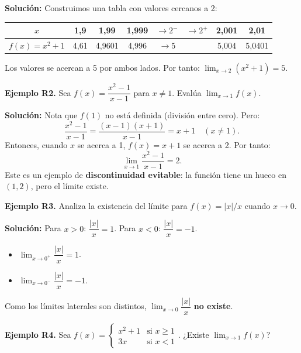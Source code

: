 \documentclass[12pt, a4paper]{article}
\begin{document}
\begin{cuadrosolucion}
  \textbf{Solución:} Construimos una tabla con valores cercanos a 2:
  \begin{center}
    \small
    \begin{tabular}{cccccccc}
      \toprule
      $x$            & 1{,}9  & 1{,}99   & 1{,}999 & $\to 2^-$ & $\to 2^+$ & 2{,}001 & 2{,}01   \\
      \midrule
      $f(x) = x^2+1$ & 4{,}61 & 4{,}9601 & 4{,}996 & $\to 5$   &           & 5{,}004 & 5{,}0401 \\
      \bottomrule
    \end{tabular}
  \end{center}
  Los valores se acercan a 5 por ambos lados. Por tanto: $\lim_{x \to 2} (x^2 + 1) = 5$.
\end{cuadrosolucion}
\newpage
\textbf{Ejemplo R2.} Sea $f(x) = \dfrac{x^2 - 1}{x - 1}$ para $x \neq 1$. Evalúa $\lim_{x \to 1} f(x)$.

\begin{cuadrosolucion}
  \textbf{Solución:} Nota que $f(1)$ no está definida (división entre cero). Pero:
  $$\frac{x^2 - 1}{x - 1} = \frac{(x - 1)(x + 1)}{x - 1} = x + 1 \quad (x \neq 1).$$
  Entonces, cuando $x$ se acerca a 1, $f(x) = x + 1$ se acerca a 2. Por tanto:
  $$\lim_{x \to 1} \frac{x^2 - 1}{x - 1} = 2.$$
  Este es un ejemplo de \textbf{discontinuidad evitable}: la función tiene un hueco en $(1, 2)$, pero el límite existe.
\end{cuadrosolucion}

\textbf{Ejemplo R3.} Analiza la existencia del límite para $f(x) = |x|/x$ cuando $x \to 0$.

\begin{cuadrosolucion}
  \textbf{Solución:} Para $x > 0$: $\dfrac{|x|}{x} = 1$. Para $x < 0$: $\dfrac{|x|}{x} = -1$.
  \begin{itemize}
    \item $\lim_{x \to 0^+} \dfrac{|x|}{x} = 1$.
    \item $\lim_{x \to 0^-} \dfrac{|x|}{x} = -1$.
  \end{itemize}
  Como los límites laterales son distintos, $\lim_{x \to 0} \dfrac{|x|}{x}$ \textbf{no existe}.
\end{cuadrosolucion}

\textbf{Ejemplo R4.} Sea $f(x) = \begin{cases} x^2 + 1 & \text{si } x \ge 1 \\ 3x & \text{si } x < 1 \end{cases}$. ¿Existe $\lim_{x \to 1} f(x)$?
\end{document}
